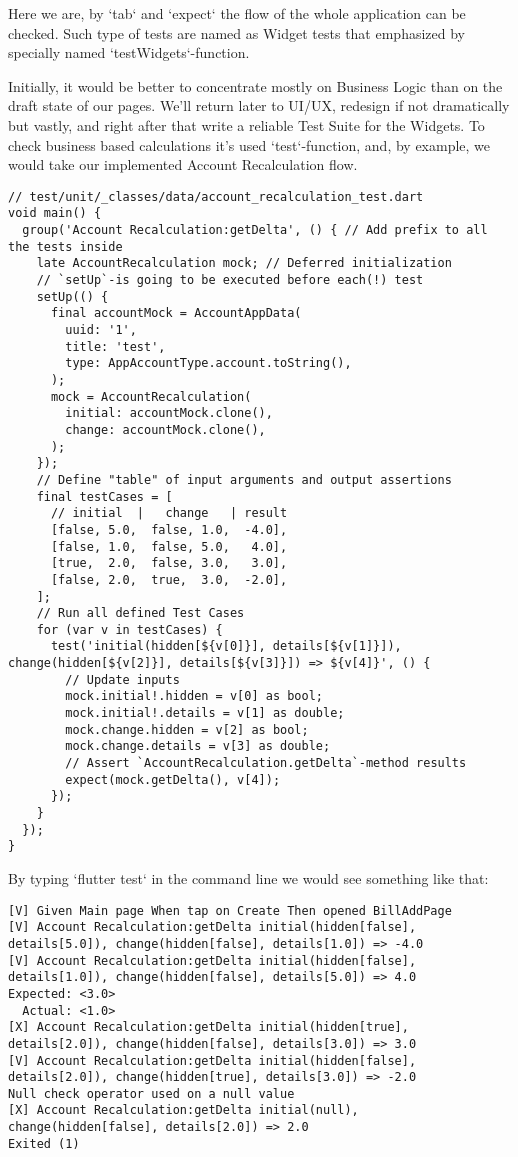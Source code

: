 Here we are, by `tab` and `expect` the flow of the whole application can be checked. Such type of tests are named as 
Widget tests that emphasized by specially named `testWidgets`-function.

Initially, it would be better to concentrate mostly on Business Logic than on the draft state of our pages. We'll 
return later to UI/UX, redesign if not dramatically but vastly, and right after that write a reliable 
Test Suite for the Widgets. To check business based calculations it's used `test`-function, and, by example, we would
take our implemented Account Recalculation flow.

\begin{lstlisting}
// test/unit/_classes/data/account_recalculation_test.dart 
void main() {
  group('Account Recalculation:getDelta', () { // Add prefix to all the tests inside
    late AccountRecalculation mock; // Deferred initialization 
    // `setUp`-is going to be executed before each(!) test
    setUp(() {
      final accountMock = AccountAppData(
        uuid: '1',
        title: 'test',
        type: AppAccountType.account.toString(),
      );
      mock = AccountRecalculation(
        initial: accountMock.clone(),
        change: accountMock.clone(),
      );
    });
    // Define "table" of input arguments and output assertions
    final testCases = [
      // initial  |   change   | result
      [false, 5.0,  false, 1.0,  -4.0],
      [false, 1.0,  false, 5.0,   4.0],
      [true,  2.0,  false, 3.0,   3.0],
      [false, 2.0,  true,  3.0,  -2.0],
    ];
    // Run all defined Test Cases
    for (var v in testCases) {
      test('initial(hidden[${v[0]}], details[${v[1]}]), change(hidden[${v[2]}], details[${v[3]}]) => ${v[4]}', () {
        // Update inputs
        mock.initial!.hidden = v[0] as bool;
        mock.initial!.details = v[1] as double;
        mock.change.hidden = v[2] as bool;
        mock.change.details = v[3] as double;
        // Assert `AccountRecalculation.getDelta`-method results
        expect(mock.getDelta(), v[4]); 
      });
    }
  });
}
\end{lstlisting}

By typing `flutter test` in the command line we would see something like that:

\begin{lstlisting}
[V] Given Main page When tap on Create Then opened BillAddPage
[V] Account Recalculation:getDelta initial(hidden[false], details[5.0]), change(hidden[false], details[1.0]) => -4.0
[V] Account Recalculation:getDelta initial(hidden[false], details[1.0]), change(hidden[false], details[5.0]) => 4.0
Expected: <3.0>
  Actual: <1.0>
[X] Account Recalculation:getDelta initial(hidden[true], details[2.0]), change(hidden[false], details[3.0]) => 3.0
[V] Account Recalculation:getDelta initial(hidden[false], details[2.0]), change(hidden[true], details[3.0]) => -2.0
Null check operator used on a null value
[X] Account Recalculation:getDelta initial(null), change(hidden[false], details[2.0]) => 2.0
Exited (1)
\end{lstlisting}

